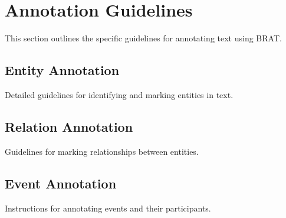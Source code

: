 
\section{Annotation Guidelines}

This section outlines the specific guidelines for annotating text using BRAT.

\subsection{Entity Annotation}

Detailed guidelines for identifying and marking entities in text.


\subsection{Relation Annotation}

Guidelines for marking relationships between entities.


\subsection{Event Annotation}

Instructions for annotating events and their participants.

